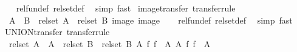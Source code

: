 \begin{isabellebody}
%
\isadelimproof
\ \ %
\endisadelimproof
%
\isatagproof
{}\isamarkupfalse%
\ rel{\isacharunderscore}{\kern0pt}fun{\isacharunderscore}{\kern0pt}def\ rel{\isacharunderscore}{\kern0pt}set{\isacharunderscore}{\kern0pt}def\ \isamarkupfalse%
\ simp\ fast%
\endisatagproof
{\isafoldproof}%
%
\isadelimproof
\isanewline
%
\endisadelimproof
\isanewline
{}\isamarkupfalse%
\ image{\isacharunderscore}{\kern0pt}transfer\ {\isacharbrackleft}{\kern0pt}transfer{\isacharunderscore}{\kern0pt}rule{\isacharbrackright}{\kern0pt}{\isacharcolon}{\kern0pt}\isanewline
\ \ {\isachardoublequoteopen}{\isacharparenleft}{\kern0pt}{\isacharparenleft}{\kern0pt}A\ {\isacharequal}{\kern0pt}{\isacharequal}{\kern0pt}{\isacharequal}{\kern0pt}{\isachargreater}{\kern0pt}\ B{\isacharparenright}{\kern0pt}\ {\isacharequal}{\kern0pt}{\isacharequal}{\kern0pt}{\isacharequal}{\kern0pt}{\isachargreater}{\kern0pt}\ rel{\isacharunderscore}{\kern0pt}set\ A\ {\isacharequal}{\kern0pt}{\isacharequal}{\kern0pt}{\isacharequal}{\kern0pt}{\isachargreater}{\kern0pt}\ rel{\isacharunderscore}{\kern0pt}set\ B{\isacharparenright}{\kern0pt}\ image\ image{\isachardoublequoteclose}\isanewline
%
\isadelimproof
\ \ %
\endisadelimproof
%
\isatagproof
{}\isamarkupfalse%
\ rel{\isacharunderscore}{\kern0pt}fun{\isacharunderscore}{\kern0pt}def\ rel{\isacharunderscore}{\kern0pt}set{\isacharunderscore}{\kern0pt}def\ \isamarkupfalse%
\ simp\ fast%
\endisatagproof
{\isafoldproof}%
%
\isadelimproof
\isanewline
%
\endisadelimproof
\isanewline
{}\isamarkupfalse%
\ UNION{\isacharunderscore}{\kern0pt}transfer\ {\isacharbrackleft}{\kern0pt}transfer{\isacharunderscore}{\kern0pt}rule{\isacharbrackright}{\kern0pt}{\isacharcolon}{\kern0pt}\ %
\isanewline
\ \ {\isachardoublequoteopen}{\isacharparenleft}{\kern0pt}rel{\isacharunderscore}{\kern0pt}set\ A\ {\isacharequal}{\kern0pt}{\isacharequal}{\kern0pt}{\isacharequal}{\kern0pt}{\isachargreater}{\kern0pt}\ {\isacharparenleft}{\kern0pt}A\ {\isacharequal}{\kern0pt}{\isacharequal}{\kern0pt}{\isacharequal}{\kern0pt}{\isachargreater}{\kern0pt}\ rel{\isacharunderscore}{\kern0pt}set\ B{\isacharparenright}{\kern0pt}\ {\isacharequal}{\kern0pt}{\isacharequal}{\kern0pt}{\isacharequal}{\kern0pt}{\isachargreater}{\kern0pt}\ rel{\isacharunderscore}{\kern0pt}set\ B{\isacharparenright}{\kern0pt}\ {\isacharparenleft}{\kern0pt}{\isasymlambda}A\ f{\isachardot}{\kern0pt}\ {\isasymUnion}{\isacharparenleft}{\kern0pt}f\ {\isacharbackquote}{\kern0pt}\ A{\isacharparenright}{\kern0pt}{\isacharparenright}{\kern0pt}\ {\isacharparenleft}{\kern0pt}{\isasymlambda}A\ f{\isachardot}{\kern0pt}\ {\isasymUnion}{\isacharparenleft}{\kern0pt}f\ {\isacharbackquote}{\kern0pt}\ A{\isacharparenright}{\kern0pt}{\isacharparenright}{\kern0pt}{\isachardoublequoteclose}\isanewline

\end{isabellebody}
